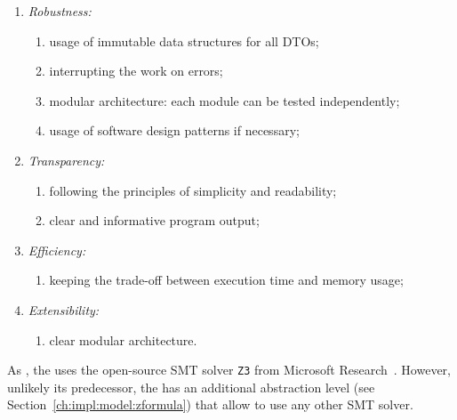 \vspace{0.5em}
\begin{enumerate}[nolistsep]
  \item \textit{Robustness:}
    \begin{enumerate}[label*=\arabic*.]
      \item usage of immutable data structures for all DTOs;
      \item interrupting the work on errors;
      \item modular architecture: each module can be tested independently;
      \item usage of software design patterns if necessary;
    \end{enumerate}
  \item \textit{Transparency:}
    \begin{enumerate}[label*=\arabic*.]
      \item following the principles of simplicity and readability;
      \item clear and informative program output;
    \end{enumerate}
  \item \textit{Efficiency:}
    \begin{enumerate}[label*=\arabic*.]%
      \item keeping the trade-off between execution time and memory usage;
    \end{enumerate}
  \item \textit{Extensibility:}
    \begin{enumerate}[label*=\arabic*.]%
      \item clear modular architecture.
    \end{enumerate}
\end{enumerate}


As \porthos[1], the \porthos[2] uses the open-source SMT solver \texttt{Z3} from Microsoft Research~\cite{de2008z3}. However, unlikely its predecessor, the \porthos[2] has an additional abstraction level \zformula{} (see Section~\ref{ch:impl:model:zformula}) that allow to use any other SMT solver. %


